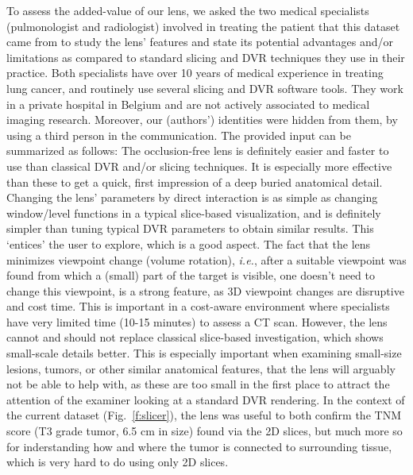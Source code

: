 To assess the added-value of our lens, we asked the two medical specialists (pulmonologist and radiologist) involved in treating the patient that this dataset came from to study the lens' features and state its potential advantages and/or limitations as compared to standard slicing and DVR techniques they use in their practice. Both specialists have over 10 years of medical experience in treating lung cancer, and routinely use several slicing and DVR software tools. They work in a private hospital in Belgium and are not actively associated to medical imaging research. Moreover, our (authors') identities were hidden from them, by using a third person in the communication. The provided input can be summarized as follows: The occlusion-free lens is definitely easier and faster to use than classical DVR and/or slicing techniques. It is especially more effective than these to get a quick, first impression of a deep buried anatomical detail. Changing the lens' parameters by direct interaction is as simple as changing window/level functions in a typical slice-based visualization, and is definitely simpler than tuning typical DVR parameters to obtain similar results. This `entices' the user to explore, which is a good aspect. The fact that the lens minimizes viewpoint change (volume rotation), \emph{i.e.}, after a suitable viewpoint was found from which a (small) part of the target is visible, one doesn't need to change this viewpoint, is a strong feature, as 3D viewpoint changes are disruptive and cost time. This is important in a cost-aware environment where specialists have very limited time (10-15 minutes) to  assess a CT scan. However, the lens cannot and should not replace classical slice-based investigation, which shows small-scale details better. This is especially important when examining small-size lesions, tumors, or other similar anatomical features, that the lens will arguably not be able to help with, as these are too small in the first place to attract the attention of the examiner looking at a standard DVR rendering. In the context of the current dataset (Fig.~\ref{f:slicer}), the lens was useful to both confirm the TNM score (T3 grade tumor, 6.5 cm in size) found via the 2D slices, but much more so for inderstanding how and where the tumor is connected to surrounding tissue, which is very hard to do using only 2D slices.

